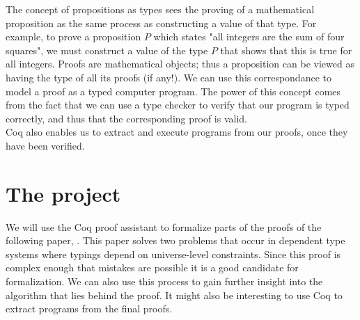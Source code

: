 \documentclass[a4paper,12pt]{article}
\begin{document}
The concept of propositions as types sees the proving of a mathematical proposition
as the same process as constructing a value of that type.
For example, to prove a proposition $P$ which states "all integers are the sum of four squares",
we must construct a value of the type $P$ that shows that this is true for all integers.
Proofs are mathematical objects; thus a proposition can be viewed as having the type of all its proofs (if any!).
We can use this correspondance to model a proof as a typed computer program.
The power of this concept comes from the fact that we can use a type checker to verify that
our program is typed correctly, and thus that the corresponding proof is valid.
\\

Coq also enables us to extract and execute programs from our proofs, once they have been verified.

\section{The project}

We will use the Coq proof assistant to formalize parts of the proofs of the following paper, \citeauthor{mbezem} \cite{mbezem}.
This paper solves two problems that occur in dependent type systems where typings depend
on universe-level constraints. Since this proof is complex enough that mistakes are possible
it is a good candidate for formalization. We can also use this process to gain further insight
into the algorithm that lies behind the proof. It might also be interesting to use Coq to
extract programs from the final proofs.

\newpage
\printbibliography
\end{document}
